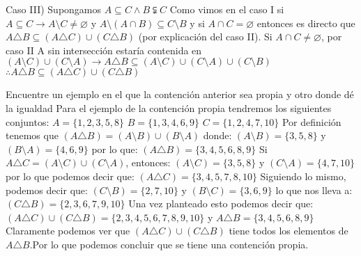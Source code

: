 Caso III) Supongamos $A \subseteq C \wedge B \subsetneqq C$\newline
Como vimos en el caso I si $A \subseteq C \rightarrow A \setminus C \neq \varnothing$ y $A \setminus (A \cap B) \subseteq C \setminus B$ y si $A \cap C = \varnothing$ entonces es directo que $A  \triangle B \subseteq (A \triangle C) \cup (C \triangle B)$ (por explicación del caso II). \newline
Si $A \cap C \neq \varnothing$, por caso II A sin intersección estaría contenida en $(A \setminus C) \cup (C \setminus A) \rightarrow A \triangle B \subseteq (A \setminus C) \cup (C \setminus A) \cup (C \setminus B)$\newline
$\therefore A \triangle B \subseteq (A \triangle C) \cup (C \triangle B)$\newline

Encuentre un ejemplo en el que la contención anterior sea propia y otro donde dé la igualdad\newline
Para el ejemplo de la contención propia tendremos los siguientes conjuntos:\newline
$A = \{1,2,3,5,8\}$\newline
$B = \{ 1,3,4,6,9 \}$\newline
$C = \{1,2,4,7,10 \}$\newline
Por definición tenemos que $(A \triangle B) = (A \setminus B ) \cup (B \setminus A)$ donde:\newline
$(A \setminus B)= \{3,5,8\}$ y $(B \setminus A)= \{4,6,9\}$  por lo que:\newline
$(A \triangle B)= \{3,4,5,6,8,9\}$ \newline
Si $A \triangle C = (A \setminus C) \cup (C\setminus A)$, entonces:
$(A \setminus C)= \{3,5,8\}$ y $(C \setminus A)= \{4,7,10\}$ por lo que podemos decir que:\newline
$(A \triangle C)= \{3,4,5,7,8,10\}$\newline
Siguiendo lo mismo, podemos decir que:\newline
$(C \setminus B)= \{2,7,10\}$ y $(B \setminus C)= \{3,6,9\}$ lo que nos lleva a:
$(C \triangle B)= \{2,3,6,7,9,10\}$\newline
Una vez planteado esto podemos decir que:\newline
$(A \triangle C) \cup (C \triangle B)= \{2,3,4,5,6,7,8,9,10\}$  y $A \triangle B = \{3,4,5,6,8,9\}$\newline
Claramente podemos ver que   $(A \triangle C) \cup (C \triangle B)$ tiene todos los elementos de $A \triangle B$.Por lo que podemos concluir que se tiene una contención propia.\\\\

